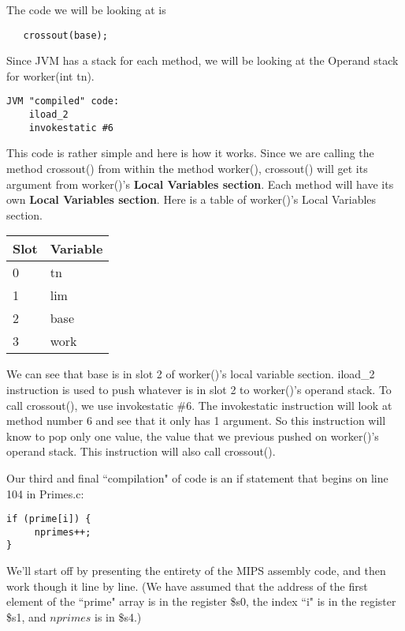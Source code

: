 \documentclass[11pt]{article}
\begin{document}
The code we will be looking at is 
\begin{verbatim}
   crossout(base);
\end{verbatim}

Since JVM has a stack for each method, we will be looking at the Operand stack for worker(int tn).

\begin{verbatim}
JVM "compiled" code:
    iload_2
    invokestatic #6
\end{verbatim}

This code is rather simple and here is how it works. Since we are calling the method crossout() from within the method worker(), crossout() will get its argument from worker()'s {\bf Local Variables section}. Each method will have its own {\bf Local Variables section}. Here is a table of worker()'s Local Variables section.

\begin{table}[h]
    \begin{tabular}{|l|l|}
        \hline
        Slot & Variable \\ \hline
        0    & tn       \\ 
        1    & lim      \\ 
        2    & base     \\ 
        3    & work     \\
        \hline
    \end{tabular}
\end{table}

We can see that base is in slot 2 of worker()'s local variable section. iload\_2 instruction is used to push whatever is in slot 2 to worker()'s operand stack. To call crossout(), we use invokestatic \#6. The invokestatic instruction will look at method number 6 and see that it only has 1 argument. So this instruction will know to pop only one value, the value that we previous pushed on worker()'s operand stack. This instruction will also call crossout().




Our third and final ``compilation" of code is an if statement that begins on line 104 in Primes.c:

\begin{verbatim}
if (prime[i]) {
     nprimes++;
}
\end{verbatim}

We'll start off by presenting the entirety of the MIPS assembly code, and then work though it line by line. (We have assumed that the address of the first element of the ``prime" array is in the register \$s0, the index ``i" is in the register \$s1, and $nprimes$ is in \$s4.)
\end{document}
